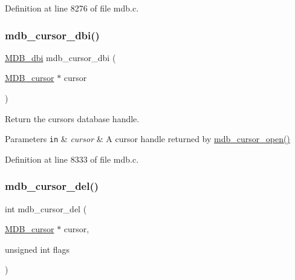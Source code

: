 Definition at line 8276 of file mdb.\+c.

\mbox{\label{group__internal_gae49a703a7ee01348b1155c6e3c3bd3e0}} 
\subsubsection{\texorpdfstring{mdb\+\_\+cursor\+\_\+dbi()}{mdb\_cursor\_dbi()}}
{\footnotesize\ttfamily \mbox{\hyperlink{group__mdb_gadbe68a06c448dfb62da16443d251a78b}{M\+D\+B\+\_\+dbi}} mdb\+\_\+cursor\+\_\+dbi (\begin{DoxyParamCaption}\item[{\mbox{\hyperlink{struct_m_d_b__cursor}{M\+D\+B\+\_\+cursor}} $\ast$}]{cursor }\end{DoxyParamCaption})}



Return the cursor\textquotesingle{}s database handle. 


\begin{DoxyParams}[1]{Parameters}
\mbox{\tt in}  & {\em cursor} & A cursor handle returned by \mbox{\hyperlink{group__mdb_ga9ff5d7bd42557fd5ee235dc1d62613aa}{mdb\+\_\+cursor\+\_\+open()}} \\
\hline
\end{DoxyParams}


Definition at line 8333 of file mdb.\+c.

\mbox{\label{group__internal_gaec9d5e29f4cc470e383b6b9f46d9239d}} 
\subsubsection{\texorpdfstring{mdb\+\_\+cursor\+\_\+del()}{mdb\_cursor\_del()}}
{\footnotesize\ttfamily int mdb\+\_\+cursor\+\_\+del (\begin{DoxyParamCaption}\item[{\mbox{\hyperlink{struct_m_d_b__cursor}{M\+D\+B\+\_\+cursor}} $\ast$}]{cursor,  }\item[{unsigned int}]{flags }\end{DoxyParamCaption})}



